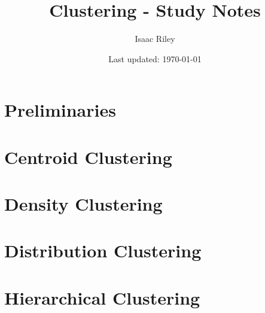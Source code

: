\documentclass[a4paper]{article}
\title{Clustering - Study Notes}
\author{Isaac Riley}
\date{Last updated: \today}
\begin{document}
\maketitle
\tableofcontents
\newpage

%

\setcounter{section}{-1}
\section{Preliminaries}


\section{Centroid Clustering}



%
%
%

\newpage
\section{Density Clustering}

%
%
%

\newpage
\section{Distribution Clustering}

%
%
%

\newpage
\section{Hierarchical Clustering}
\end{document}
